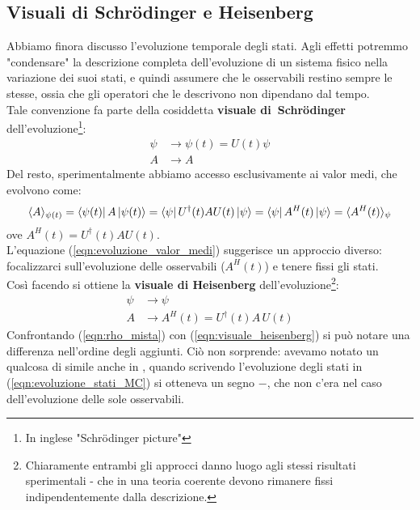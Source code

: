 \documentclass[../../FisicaTeorica.tex]{subfiles}
\begin{document}
\subsection{Visuali di Schrödinger e Heisenberg}
Abbiamo finora discusso l'evoluzione temporale degli stati. Agli effetti potremmo "condensare" la descrizione completa dell'evoluzione di un sistema fisico nella variazione dei suoi stati, e quindi assumere che le osservabili restino sempre le stesse, ossia che gli operatori che le descrivono non dipendano dal tempo.\\
Tale convenzione fa parte della cosiddetta \textbf{visuale di\ Schrödinger} dell'evoluzione\footnote{In inglese "Schrödinger picture"}:
\begin{align}
    \psi &\to \psi(t) = U(t)\psi
    \label{eqn:visuale_schrodinger}
    \\
    A &\to A\nonumber
\end{align}
Del resto, sperimentalmente abbiamo accesso esclusivamente ai valor medi, che evolvono come:
\begin{equation}
\langle A\rangle_{\psi(t)}=\Bra{\psi(t)}A\Ket{\psi(t)}=\Bra{\psi}U^\dag(t)AU(t)\Ket{\psi} = \Bra{\psi}A^H(t)\Ket{\psi} = \langle A^H(t)\rangle_\psi
\label{eqn:evoluzione_valor_medi}
\end{equation}
ove $A^H(t) = U^\dag(t)AU(t)$.\\

L'equazione (\ref{eqn:evoluzione_valor_medi}) suggerisce un approccio diverso: focalizzarci sull'evoluzione delle osservabili ($A^H(t)$) e tenere fissi gli stati.\\
Così facendo si ottiene la \textbf{visuale di Heisenberg} dell'evoluzione\footnote{Chiaramente entrambi gli approcci danno luogo agli stessi risultati sperimentali - che in una teoria coerente devono rimanere fissi indipendentemente dalla descrizione.}:
\begin{align}
    \psi &\to \psi
    \label{eqn:visuale_heisenberg}
    \\
    A &\to A^H(t)=U^\dag (t)A\,U(t)
    \nonumber
\end{align}
Confrontando (\ref{eqn:rho_mista}) con (\ref{eqn:visuale_heisenberg}) si può notare una differenza nell'ordine degli aggiunti. Ciò non sorprende: avevamo notato un qualcosa di simile anche in \MC, quando scrivendo l'evoluzione degli stati in (\ref{eqn:evoluzione_stati_MC}) si otteneva un segno $-$, che non c'era nel caso dell'evoluzione delle sole osservabili.\\
\end{document}
